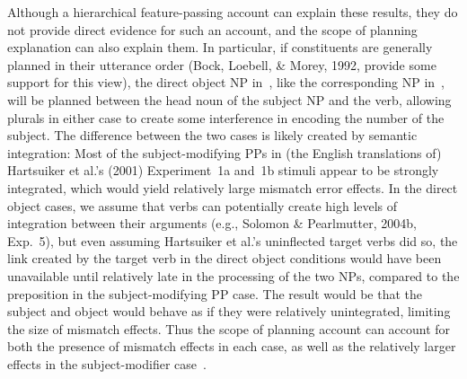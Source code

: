 \documentclass[12pt,titlepage]{article}
\begin{document}
Although a hierarchical feature-passing account can explain these results,
they do not provide direct evidence for such an account, and the scope of
planning explanation can also explain them.  In particular, if constituents
are generally planned in their utterance order (Bock, Loebell, \& Morey,
1992, provide some support for this view), the direct object NP
in~, like the corresponding NP in~, will be
planned between the head noun of the subject NP and the verb, allowing
plurals in either case to create some interference in encoding the number
of the subject.  The difference between the two cases is likely created by
semantic integration: Most of the subject-modifying PPs in (the English
translations of) Hartsuiker et al.'s (2001) Experiment~1a and~1b stimuli
appear to be strongly integrated, which would yield relatively large
mismatch error effects.  In the direct object cases, we assume that verbs
can potentially create high levels of integration between their arguments
(e.g., Solomon \& Pearlmutter, 2004b, Exp.~5), but even assuming Hartsuiker
et al.'s uninflected target verbs did so, the link created by the target
verb in the direct object conditions would have been unavailable until
relatively late in the processing of the two NPs, compared to the
preposition in the subject-modifying PP case.  The result would be that the
subject and object would behave as if they were relatively unintegrated,
limiting the size of mismatch effects.  Thus the scope of planning account
can account for both the presence of mismatch effects in each case, as well
as the relatively larger effects in the subject-modifier
case~.
\end{document}
